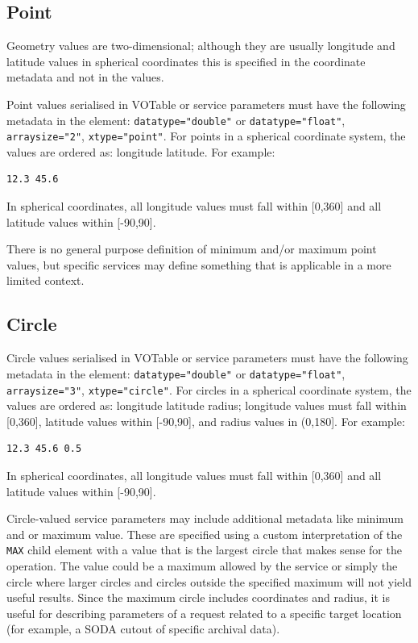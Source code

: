 \documentclass[11pt,letter]{ivoa}
\begin{document}
\subsection{Point}
Geometry values are two-dimensional; although they are usually longitude and
latitude values in spherical coordinates this is specified in the coordinate
metadata and not in the values.

Point values serialised in VOTable or service parameters must have the following metadata in the
 element: \verb|datatype="double"| or \verb|datatype="float"|, \verb|arraysize="2"|,
\verb|xtype="point"|. For points in a
spherical coordinate system, the values are ordered as: longitude latitude. For
example:

\begin{verbatim}
12.3 45.6
\end{verbatim}

In spherical coordinates, all longitude values must fall within [0,360] and all
latitude values within [-90,90].

There is no general purpose definition of minimum and/or maximum point values, but
specific services may define something that is applicable in a more limited context.

\subsection{Circle}
Circle values serialised in VOTable or service parameters must have the following metadata in the
 element: \verb|datatype="double"| or \verb|datatype="float"|, \verb|arraysize="3"|,
\verb|xtype="circle"|. For circles
in a spherical coordinate system, the values are ordered as: longitude latitude
radius; longitude values must fall within [0,360], latitude values
within [-90,90], and radius values in (0,180]. For example:

\begin{verbatim}
12.3 45.6 0.5
\end{verbatim}

In spherical coordinates, all longitude values must fall within [0,360] and all
latitude values within [-90,90].

Circle-valued service parameters may include additional metadata like minimum and
or maximum value. These are specified using a custom interpretation of the
\verb|MAX| child element with a value that is the largest circle that makes sense
for the operation. The value could be a maximum allowed by the service or simply
the circle where larger circles and circles outside the specified maximum will not
yield useful results. Since the maximum circle includes coordinates and radius,
it is useful for describing parameters of a request related to a specific target
location (for example, a SODA cutout of specific archival data).
\end{document}

